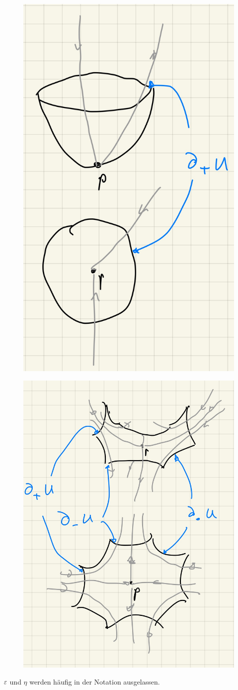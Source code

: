 \begin{definition}
    \begin{figure}[ht]
        \centering
        \begin{minipage}{.4\textwidth}
          \centering
          \includegraphics[width=.4\linewidth]{../resources/def-notation-morse-umgebung-1.JPG}
          \label{fig: morse umgebung ind 0}
        \end{minipage}%
        \begin{minipage}{.4\textwidth}
          \centering
          \includegraphics[width=.4\linewidth]{../resources/def-notation-morse-umgebung-2.JPG}
          \label{fig: morse umgebung ind k}
        \end{minipage}
    \end{figure}

    $\varepsilon$ und $\eta$ werden häufig in der Notation ausgelassen.
\end{definition}


